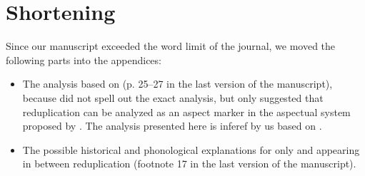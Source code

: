 \documentclass[fleqn,twoside]{article}
\begin{document}
\section{Shortening}
Since our manuscript exceeded the word limit of the journal, we moved the following parts into the appendices:
\begin{itemize}
    \item The analysis based on \citet{Tsai2008} (p. 25--27 in the last version of the manuscript), because \citet{YangWei2017} did not spell out the exact analysis, but only suggested that reduplication can be analyzed as an aspect marker in the aspectual system proposed by \citet{Tsai2008}. The analysis presented here is inferef by us based on \citet{Tsai2008}.
    
    \item The possible historical and phonological explanations for only  and  appearing in between reduplication (footnote 17 in the last version of the manuscript).
\end{itemize}
    

{\sloppy
\printbibliography[heading=subbibliography,notkeyword=this]
}
\end{document}
